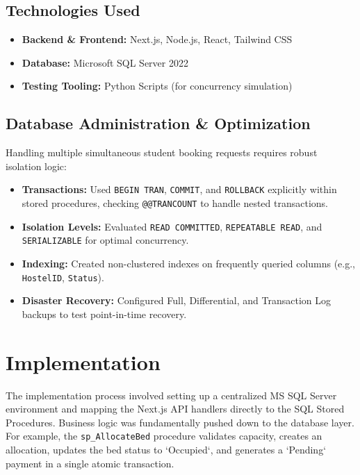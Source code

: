 \documentclass[12pt, a4paper]{report}
\begin{document}
\section{Technologies Used}
\begin{itemize}
    \item \textbf{Backend \& Frontend:} Next.js, Node.js, React, Tailwind CSS
    \item \textbf{Database:} Microsoft SQL Server 2022
    \item \textbf{Testing Tooling:} Python Scripts (for concurrency simulation)
\end{itemize}

\section{Database Administration \& Optimization}
Handling multiple simultaneous student booking requests requires robust isolation logic:
\begin{itemize}
    \item \textbf{Transactions:} Used \texttt{BEGIN TRAN}, \texttt{COMMIT}, and \texttt{ROLLBACK} explicitly within stored procedures, checking \texttt{@@TRANCOUNT} to handle nested transactions.
    \item \textbf{Isolation Levels:} Evaluated \texttt{READ COMMITTED}, \texttt{REPEATABLE READ}, and \texttt{SERIALIZABLE} for optimal concurrency.
    \item \textbf{Indexing:} Created non-clustered indexes on frequently queried columns (e.g., \texttt{HostelID}, \texttt{Status}).
    \item \textbf{Disaster Recovery:} Configured Full, Differential, and Transaction Log backups to test point-in-time recovery.
\end{itemize}

\chapter{Implementation}
The implementation process involved setting up a centralized MS SQL Server environment and mapping the Next.js API handlers directly to the SQL Stored Procedures. Business logic was fundamentally pushed down to the database layer. For example, the \texttt{sp\_AllocateBed} procedure validates capacity, creates an allocation, updates the bed status to `Occupied`, and generates a `Pending` payment in a single atomic transaction.
\end{document}
